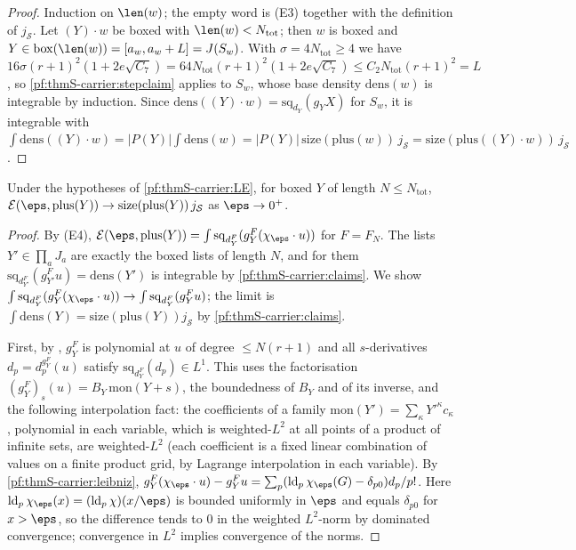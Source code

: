 \begin{proof}
Induction on $\len(w)$; the empty word is (E3) together with the definition of $j_{\mathcal S}$. Let $(Y)\cdot w$ be boxed with
$\len(w)<N_{\mathrm{tot}}$; then $w$ is boxed and $Y\in\mathrm{box}(\len(w))=[a_w,a_w+L]=J(S_w)$. With $\sigma=4N_{\mathrm{tot}}
\ge4$ we have $16\sigma(r+1)^2(1+2e\sqrt{C_7})=64N_{\mathrm{tot}}(r+1)^2(1+2e\sqrt{C_7})\le C_2N_{\mathrm{tot}}(r+1)^2=L$, so
\cref{pf:thmS-carrier:stepclaim} applies to $S_w$, whose base density $\mathrm{dens}(w)$ is integrable by induction. Since
$\mathrm{dens}((Y)\cdot w)=\mathrm{sq}_{d_Y}(g_YX)$ for $S_w$, it is integrable with
$\int\mathrm{dens}((Y)\cdot w)=|P(Y)|\int\mathrm{dens}(w)=|P(Y)|\,\mathrm{size}(\mathrm{plus}(w))\,j_{\mathcal S}=
\mathrm{size}(\mathrm{plus}((Y)\cdot w))\,j_{\mathcal S}$.
\end{proof}

\begin{lemma}\label{pf:thmS-carrier:boxlimit}
Under the hypotheses of \cref{pf:thmS-carrier:LE}, for boxed $Y$ of length $N\le N_{\mathrm{tot}}$,
$\thmScarrierEn(\eps,\mathrm{plus}(Y))\to\mathrm{size}(\mathrm{plus}(Y))\,j_{\mathcal S}$ as $\eps\to0^+$.
\end{lemma}

\begin{proof}
By (E4), $\thmScarrierEn(\eps,\mathrm{plus}(Y))=\int\mathrm{sq}_{d^F_Y}(g^F_Y(\chi_\eps\cdot u))$ for $F=F_N$. The lists
$Y'\in\prod_aJ_a$ are exactly the boxed lists of length $N$, and for them $\mathrm{sq}_{d^F_{Y'}}(g^F_{Y'}u)=\mathrm{dens}(Y')$ is
integrable by \cref{pf:thmS-carrier:claims}. We show $\int\mathrm{sq}_{d^F_Y}(g^F_Y(\chi_\eps\cdot u))\to\int\mathrm{sq}_{d^F_Y}
(g^F_Yu)$; the limit is $\int\mathrm{dens}(Y)=\mathrm{size}(\mathrm{plus}(Y))j_{\mathcal S}$ by \cref{pf:thmS-carrier:claims}.

First, by , $g^F_Y$ is polynomial at $u$ of degree $\le N(r+1)$ and all
$s$-derivatives $d_p=d^{g^F_Y}_p(u)$ satisfy $\mathrm{sq}_{d^F_Y}(d_p)\in L^1$. This uses the factorisation
$(g^F_Y)_s(u)=B_Y\,\mathrm{mon}(Y+s)$, the boundedness of $B_Y$ and of its inverse, and the following interpolation fact: the
coefficients of a family $\mathrm{mon}(Y')=\sum_\kappa Y'^\kappa c_\kappa$, polynomial in each variable, which is weighted-$L^2$
at all points of a product of infinite sets, are weighted-$L^2$ (each coefficient is a fixed linear combination of values on a
finite product grid, by Lagrange interpolation in each variable). By \cref{pf:thmS-carrier:leibniz},
$g^F_Y(\chi_\eps\cdot u)-g^F_Yu=\sum_p(\thmScarrierld_p\chi_\eps(G)-\delta_{p0})d_p/p!$. Here
$\thmScarrierld_p\chi_\eps(x)=(\thmScarrierld_p\chi)(x/\eps)$ is bounded uniformly in $\eps$ and equals $\delta_{p0}$ for
$x>\eps$, so the difference tends to $0$ in the weighted $L^2$-norm by dominated convergence; convergence in $L^2$ implies
convergence of the norms.
\end{proof}

